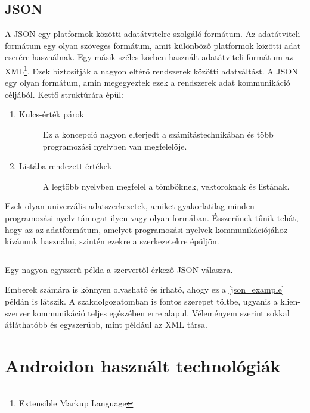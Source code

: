 \documentclass{thesis-ekf}
\theoremstyle{definition}
\theoremstyle{remark}
\begin{document}
\subsection{JSON}

A JSON egy platformok közötti adatátvitelre szolgáló formátum.
Az adatátviteli formátum egy olyan szöveges formátum, amit különböző platformok közötti adat cserére használnak.
Egy másik széles körben használt adatátviteli formátum az XML\footnote{Extensible Markup Language}.
Ezek biztosítják a nagyon eltérő rendszerek közötti adatváltást.
A JSON egy olyan formátum, amin megegyeztek ezek a rendszerek adat kommunikáció céljából. \cite{json1}
Kettő struktúrára épül:

\begin{enumerate}
	\item
	\begin{description}
		\item[Kulcs-érték párok] Ez a koncepció nagyon elterjedt a számítástechnikában és több programozási nyelvben van megfelelője. 
	\end{description}
	\item
	\begin{description}
		\item[Listába rendezett értékek] A legtöbb nyelvben megfelel a tömböknek, vektoroknak és listának.
	\end{description}
\end{enumerate}

Ezek olyan univerzális adatszerkezetek, amiket gyakorlatilag minden programozási nyelv támogat ilyen vagy olyan formában.
Ésszerűnek tűnik tehát, hogy az az adatformátum, amelyet programozási nyelvek kommunikációjához kívánunk használni, szintén ezekre a szerkezetekre épüljön.\cite{json2}

\begin{listing}[ht]
	\inputminted[linenos=true]{json}{./codes/result.json}
	\caption{Egy nagyon egyszerű példa a szervertől érkező JSON válaszra.}
	\label{json_example}
\end{listing}

Emberek számára is könnyen olvasható és írható, ahogy ez a \ref{json_example} példán is látszik. 
A szakdolgozatomban is fontos szerepet töltbe, ugyanis a klien-szerver kommunikáció teljes egészében erre alapul.
Véleményem szerint sokkal átláthatóbb és egyszerűbb, mint például az XML társa.

\section{Androidon használt technológiák}
\end{document}
